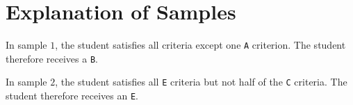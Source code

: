 \section*{Explanation of Samples}
In sample $1$, the student satisfies all criteria except one \texttt{A} criterion. The student therefore receives a \texttt{B}.

In sample $2$, the student satisfies all \texttt{E} criteria but not half of the \texttt{C} criteria. The student therefore receives an \texttt{E}.
